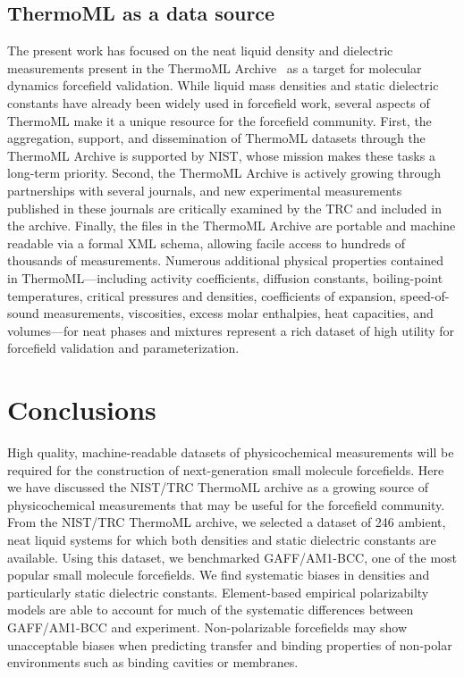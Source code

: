 \documentclass[journal=jacsat,manuscript=article]{achemso}
\begin{document}
\subsection{ThermoML as a data source}

The present work has focused on the neat liquid density and dielectric measurements present in the ThermoML Archive~\cite{frenkel2006xml, frenkel2003thermoml, chirico2003thermoml} as a target for molecular dynamics forcefield validation.  
While liquid mass densities and static dielectric constants have already been widely used in forcefield work, several aspects of ThermoML make it a unique resource for the forcefield community.  
First, the aggregation, support, and dissemination of ThermoML datasets through the ThermoML Archive is supported by NIST, whose mission makes these tasks a long-term priority.  
Second, the ThermoML Archive is actively growing through partnerships with several journals, and new experimental measurements published in these journals are critically examined by the TRC and included in the archive.  
Finally, the files in the ThermoML Archive are portable and machine readable via a formal XML schema, allowing facile access to hundreds of thousands of measurements.  
Numerous additional physical properties contained in ThermoML---including activity coefficients, diffusion constants, boiling-point temperatures, critical pressures and densities, coefficients of expansion, speed-of-sound measurements, viscosities, excess molar enthalpies, heat capacities, and volumes---for neat phases and mixtures represent a rich dataset of high utility for forcefield validation and parameterization.


\section{Conclusions}

High quality, machine-readable datasets of physicochemical measurements will be required for the construction of next-generation small molecule forcefields.  
Here we have discussed the NIST/TRC ThermoML archive as a growing source of physicochemical measurements that may be useful for the forcefield community.
From the NIST/TRC ThermoML archive, we selected a dataset of 246 ambient, neat liquid systems for which both densities and static dielectric constants are available.  
Using this dataset, we benchmarked GAFF/AM1-BCC, one of the most popular small molecule forcefields.
We find systematic biases in densities and particularly static dielectric constants.
Element-based empirical polarizabilty models are able to account for much of the systematic differences between GAFF/AM1-BCC and experiment.  
Non-polarizable forcefields may show unacceptable biases when predicting transfer and binding properties of non-polar environments such as binding cavities or membranes.  
\end{document}
